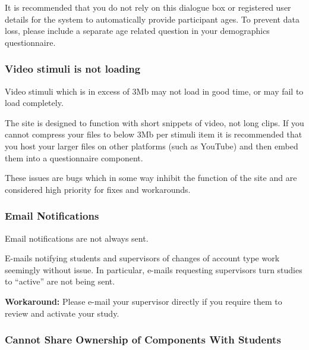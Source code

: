\documentclass[]{book}
\begin{document}
It is recommended that you do not rely on this dialogue box or
registered user details for the system to automatically provide
participant ages. To prevent data loss, please include a separate age
related question in your demographics questionnaire.

\subsubsection*{Video stimuli is not
loading}\label{video-stimuli-is-not-loading}

Video stimuli which is in excess of 3Mb may not load in good time, or
may fail to load completely.

The site is designed to function with short snippets of video, not long
clips. If you cannot compress your files to below 3Mb per stimuli item
it is recommended that you host your larger files on other platforms
(such as YouTube) and then embed them into a questionnaire component.

These issues are bugs which in some way inhibit the function of the site
and are considered high priority for fixes and workarounds.

\subsubsection*{Email Notifications}\label{email-notifications}

Email notifications are not always sent.

E-mails notifying students and supervisors of changes of account type
work seemingly without issue. In particular, e-mails requesting
supervisors turn studies to ``active'' are not being sent.

\begin{workaround}
\textbf{Workaround:} Please e-mail your supervisor directly if you
require them to review and activate your study.
\end{workaround}

\subsubsection*{Cannot Share Ownership of Components With
Students}\label{cannot-share-ownership-of-components-with-students}
\end{document}
